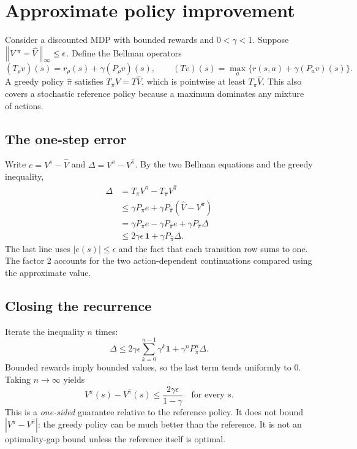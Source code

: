 


\section{Approximate policy improvement}
Consider a discounted MDP with bounded rewards and $0<\gamma<1$. Suppose
$\left\lVert V^\pi-\widehat V\right\rVert_\infty\leq\epsilon$. Define the Bellman operators
\[
 (T_\rho v)(s)=r_\rho(s)+\gamma(P_\rho v)(s),\qquad
 (Tv)(s)=\max_a\{r(s,a)+\gamma(P_av)(s)\}.
\]
A greedy policy $\widehat\pi$ satisfies $T_{\widehat\pi}\widehat V=T\widehat V$,
which is pointwise at least $T_\pi\widehat V$. This also covers a stochastic
reference policy because a maximum dominates any mixture of actions.

\subsection{The one-step error}
Write $e=V^\pi-\widehat V$ and $\Delta=V^\pi-V^{\widehat\pi}$. By the two
Bellman equations and the greedy inequality,
\begin{align*}
 \Delta
 &=T_\pi V^\pi-T_{\widehat\pi}V^{\widehat\pi}\\
 &\leq\gamma P_\pi e
           +\gamma P_{\widehat\pi}(\widehat V-V^{\widehat\pi})\\
 &=\gamma P_\pi e-\gamma P_{\widehat\pi}e
                                +\gamma P_{\widehat\pi}\Delta\\
 &\leq2\gamma\epsilon\,\mathbf1+\gamma P_{\widehat\pi}\Delta.
\end{align*}
The last line uses $|e(s)|\leq\epsilon$ and the fact that each transition
row sums to one. The factor 2 accounts for the two action-dependent
continuations compared using the approximate value.

\subsection{Closing the recurrence}
Iterate the inequality $n$ times:
\[
 \Delta\leq2\gamma\epsilon\sum_{k=0}^{n-1}\gamma^k\mathbf1
               +\gamma^n P_{\widehat\pi}^n\Delta.
\]
Bounded rewards imply bounded values, so the last term tends uniformly to 0.
Taking $n\to\infty$ yields
\[
 \boxed{V^\pi(s)-V^{\widehat\pi}(s)
          \leq\frac{2\gamma\epsilon}{1-\gamma}\quad\text{for every }s.}
\]
This is a \emph{one-sided} guarantee relative to the reference policy. It
does not bound $|V^\pi-V^{\widehat\pi}|$: the greedy policy can be much
better than the reference. It is not an optimality-gap bound unless the
reference itself is optimal.

